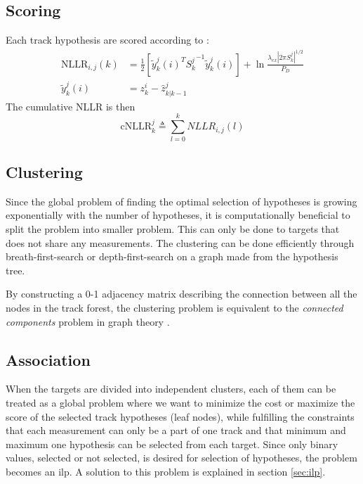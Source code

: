 \subsection{Scoring}
Each track hypothesis are scored according to \cite{Bar-Shalom2007}:
\begin{equation}
\begin{split}
\mathrm{NLLR}_{i,j}(k) &= \frac{1}{2} \left[ {\tilde{y}_k^j}(i)^T {S_k^j}^{-1} {\tilde{y}_k^j}(i) \right] + \ln \frac{\lambda_{ex} |2 \pi S_k^j|^{1/2}}{P_D} \\				
\tilde{y}_k^j(i) &= z_k^i -\hat{z}_{k|k-1}^j
\end{split}
\end{equation}
The cumulative NLLR is then
\begin{equation}
\mathrm{cNLLR}_k^j \triangleq \sum_{l=0}^k NLLR_{i,j}(l)
\end{equation}

\subsection{Clustering}
Since the global problem of finding the optimal selection of hypotheses is growing exponentially with the number of hypotheses, it is computationally beneficial to split the problem into smaller problem. This can only be done to targets that does not share any measurements. The clustering can be done efficiently through breath-first-search or depth-first-search on a graph made from the hypothesis tree.

By constructing a 0-1 adjacency matrix describing the connection between all the nodes in the track forest, the clustering problem is equivalent to the \emph{connected components} problem in graph theory \cite{Chen2015}.

\subsection{Association}
When the targets are divided into independent clusters, each of them can be treated as a global problem where we want to minimize the cost or maximize the score of the selected track hypotheses (leaf nodes), while fulfilling the constraints that each measurement can only be a part of one track and that minimum and maximum one hypothesis can be selected from each target. Since only binary values, selected or not selected, is desired for selection of hypotheses, the problem becomes an \gls{ilp}. A solution to this problem is explained in section \ref{sec:ilp}.

